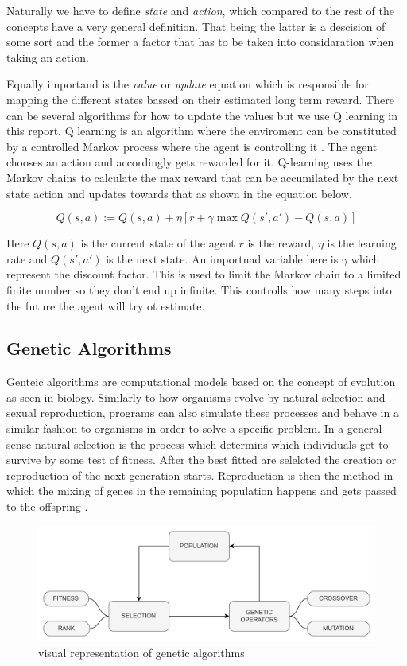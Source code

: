 Naturally we have to define \textit{state} and \textit{action}, which compared to the rest of the concepts have a very general definition. That being the latter is a descision of some sort and the former a factor that has to be taken into considaration when taking an action. 

Equally importand is the \textit{value} or \textit{update} equation which is responsible for mapping the different states bassed on their estimated long term reward. There can be several algorithms for how to update the values but we use Q learning in this report. Q learning is an algorithm where the enviroment can be constituted by a controlled Markov process where the agent is controlling it \cite{watkins1992q}. The agent chooses an action and accordingly gets rewarded for it. Q-learning uses the Markov chains to calculate the max reward that can be accumilated by the next state action and updates towards that as shown in the equation below.

\begin{equation}
    { Q(s,a) := Q(s,a) + \eta [r + \gamma \max Q(s',a') - Q(s,a)]}
\end{equation}

Here $Q(s,a)$ is the current state of the agent $r$ is the reward, $\eta$ is the learning rate and $Q(s',a')$ is the next state. An importnad variable here is $\gamma$ which represent the discount factor. This is used to limit the Markov chain to a limited finite number so they don't end up infinite. This controlls how many steps into the future the agent will try ot estimate. 


\subsection{Genetic Algorithms}

Genteic algorithms are computational models based on the concept of evolution as seen in biology. Similarly to how organisms evolve by natural selection and sexual reproduction, programs can also simulate these processes and behave in a similar fashion to organisms in order to solve a specific problem. In a general sense natural selection is the process which determins which individuals get to survive by some test of fitness. After the best fitted are selelcted the creation or reproduction of the next generation starts. Reproduction is then the method in which the mixing of genes in the remaining population happens and gets passed to the offspring \cite{holland1992genetic}.
\begin{figure}[H]
    \centering
    \includegraphics [scale = 0.08]{Images/GA_graph.png}
    \caption{visual representation of genetic algorithms}
    \label{figGA}
\end{figure}

